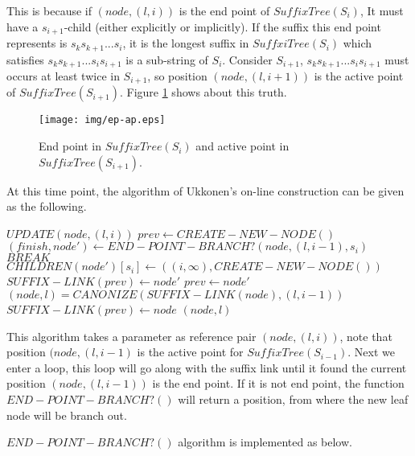 \documentclass{article}
\begin{document}
This is because if $(node, (l, i))$ is the end point of $SuffixTree(S_i)$,
It must have a $s_{i+1}$-child (either explicitly or implicitly).
If the suffix this end point represents is $s_ks_{k+1}...s_i$, it is the longest
suffix in $SuffxiTree(S_i)$ which satisfies $s_ks_{k+1}...s_is_{i+1}$ is a sub-string
of $S_i$. Consider $S_{i+1}$, $s_ks_{k+1}...s_is_{i+1}$ must occurs at least
twice in $S_{i+1}$, so position $(node, (l, i+1))$ is the active point of
$SuffixTree(S_{i+1})$. Figure \ref{fig:ep-ap} shows about this truth.

\begin{figure}[htbp]
   \begin{center}
     \texttt{[image: img/ep-ap.eps]}
     \caption{End point in $SuffixTree(S_i)$ and active point in $SuffixTree(S_{i+1})$.}
     \label{fig:ep-ap}
   \end{center}
\end{figure}

At this time point, the algorithm of Ukkonen's on-line construction can 
be given as the following.

\begin{algorithmic}
\STATE $UPDATE(node, (l, i))$
  \STATE $prev \leftarrow CREATE-NEW-NODE()$
    \STATE $(finish, node') \leftarrow END-POINT-BRANCH?(node, (l, i-1), s_i)$
      \STATE $BREAK$
    \ENDIF
    \STATE $CHILDREN(node')[s_i] \leftarrow ((i, \infty), CREATE-NEW-NODE())$
    \STATE $SUFFIX-LINK(prev) \leftarrow node'$
    \STATE $prev \leftarrow node'$
    \STATE $(node, l) = CANONIZE(SUFFIX-LINK(node), (l, i-1))$
  \ENDWHILE
  \STATE $SUFFIX-LINK(prev) \leftarrow node$
  \RETURN $(node, l)$
\end{algorithmic}

This algorithm takes a parameter as reference pair $(node, (l, i))$, note that
position $(node, (l, i-1)$ is the active point for $SuffixTree(S_{i-1})$.
Next we enter a loop, this loop will go along with the suffix link until it
found the current position $(node, (l, i-1))$ is the end point. If it is not
end point, the function $END-POINT-BRANCH?()$ will return a position, from 
where the new leaf node will be branch out.

$END-POINT-BRANCH?()$ algorithm is implemented as below.
\end{document}

